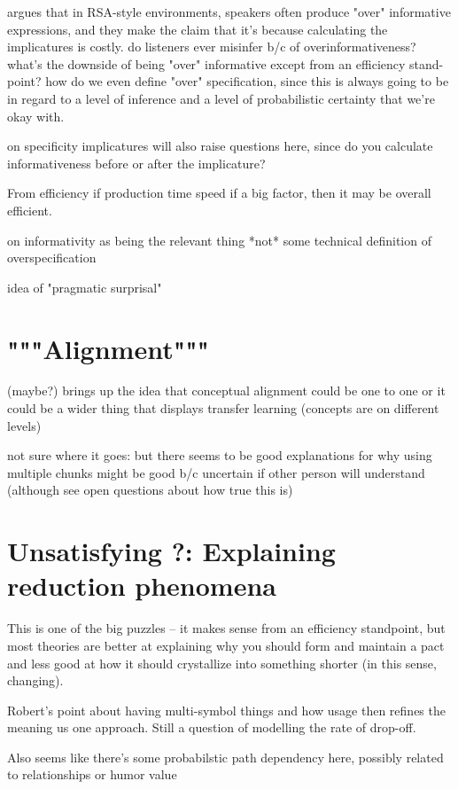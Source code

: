 \documentclass[]{article}
\begin{document}
\cite{baumann2014} argues that in RSA-style environments, speakers often produce "over" informative expressions, and they make the claim that it's because calculating the implicatures is costly.  do listeners ever misinfer b/c of overinformativeness? what's the downside of being "over" informative except from an efficiency stand-point? how do we even define "over" specification, since this is always going to be in regard to a level of inference and a level of probabilistic certainty that we're okay with. 

\cite{bergen} on specificity implicatures will also raise questions here, since do you calculate informativeness before or after the implicature? 

From efficiency if production time speed if a big factor, then it may be overall efficient. 

\cite{degen20200406} on informativity as being the relevant thing *not* some technical definition of overspecification 

idea of "pragmatic surprisal" 

\section{"""Alignment"""}

\cite{eliav2023} (maybe?) brings up the idea that conceptual alignment could be one to one or it could be a wider thing that displays transfer learning (concepts are on different levels) 

not sure where it goes: but there seems to be good explanations for why using multiple chunks might be good b/c uncertain if other person will understand (although see open questions about how true this is) 

\section{Unsatisfying ?: Explaining reduction phenomena}
This is one of the big puzzles -- it makes sense from an efficiency standpoint, but most theories are better at explaining why you should form and maintain a pact and less good at how it should crystallize into something shorter (in this sense, changing). 

Robert's point about having multi-symbol things and how usage then refines the meaning us one approach. Still a question of modelling the rate of drop-off. 

Also seems like there's some probabilstic path dependency here, possibly related to relationships or humor value
\end{document}
